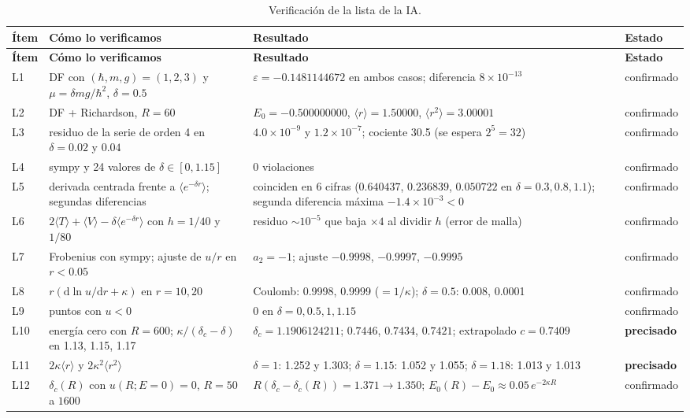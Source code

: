 \documentclass[11pt]{article}
\newcommand{\dd}{\mathrm{d}}
\newcommand{\dc}{\delta_c}
\begin{document}
\begin{longtable}{@{}lL{4.3cm}L{6.0cm}L{2.4cm}@{}}
\caption{Verificación de la lista de la IA.}\label{tab:limites}\\
\toprule
\textbf{Ítem} & \textbf{Cómo lo verificamos} & \textbf{Resultado} & \textbf{Estado}\\
\midrule
\endfirsthead
\toprule
\textbf{Ítem} & \textbf{Cómo lo verificamos} & \textbf{Resultado} & \textbf{Estado}\\
\midrule
\endhead
L1 & DF con $(\hbar,m,g)=(1,2,3)$ y $\mu=\delta mg/\hbar^2$, $\delta=0.5$ & $\varepsilon=-0.1481144672$ en ambos casos; diferencia $8\times10^{-13}$ & confirmado\\
L2 & DF + Richardson, $R=60$ & $E_0=-0.500000000$, $\langle r\rangle=1.50000$, $\langle r^2\rangle=3.00001$ & confirmado\\
L3 & residuo de la serie de orden 4 en $\delta=0.02$ y $0.04$ & $4.0\times10^{-9}$ y $1.2\times10^{-7}$; cociente 30.5 (se espera $2^5=32$) & confirmado\\
L4 & sympy y 24 valores de $\delta\in[0,1.15]$ & 0 violaciones & confirmado\\
L5 & derivada centrada frente a $\langle e^{-\delta r}\rangle$; segundas diferencias & coinciden en 6 cifras ($0.640437$, $0.236839$, $0.050722$ en $\delta=0.3,0.8,1.1$); segunda diferencia máxima $-1.4\times10^{-3}<0$ & confirmado\\
L6 & $2\langle T\rangle+\langle V\rangle-\delta\langle e^{-\delta r}\rangle$ con $h=1/40$ y $1/80$ & residuo $\sim10^{-5}$ que baja $\times4$ al dividir $h$ (error de malla) & confirmado\\
L7 & Frobenius con sympy; ajuste de $u/r$ en $r<0.05$ & $a_2=-1$; ajuste $-0.9998$, $-0.9997$, $-0.9995$ & confirmado\\
L8 & $r(\dd\ln u/\dd r+\kappa)$ en $r=10,20$ & Coulomb: 0.9998, 0.9999 ($=1/\kappa$); $\delta=0.5$: 0.008, 0.0001 & confirmado\\
L9 & puntos con $u<0$ & 0 en $\delta=0,0.5,1,1.15$ & confirmado\\
L10 & energía cero con $R=600$; $\kappa/(\dc-\delta)$ en 1.13, 1.15, 1.17 & $\dc=1.1906124211$; $0.7446$, $0.7434$, $0.7421$; extrapolado $c=0.7409$ & \textbf{precisado}\\
L11 & $2\kappa\langle r\rangle$ y $2\kappa^2\langle r^2\rangle$ & $\delta=1$: 1.252 y 1.303; $\delta=1.15$: 1.052 y 1.055; $\delta=1.18$: 1.013 y 1.013 & \textbf{precisado}\\
L12 & $\dc(R)$ con $u(R;E=0)=0$, $R=50$ a $1600$ & $R(\dc-\dc(R))=1.371\to1.350$; $E_0(R)-E_0\approx0.05\,e^{-2\kappa R}$ & confirmado\\

\end{longtable}
\end{document}
